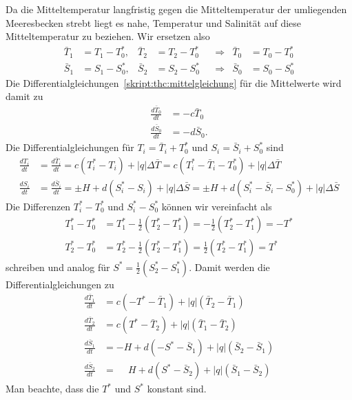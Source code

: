 Da die Mitteltemperatur langfristig gegen die Mitteltemperatur der
umliegenden Meeresbecken strebt liegt es nahe, Temperatur und
Salinität auf diese Mitteltemperatur zu beziehen.
Wir ersetzen also
\begin{equation}
\begin{aligned}
\bar T_1&=T_1-T_0^*,
&
\bar T_2&=T_2-T_0^*
&&\Rightarrow&
\bar T_0&=T_0-T_0^*
\\
\bar S_1&=S_1-S_0^*,
&
\bar S_2&=S_2-S_0^*
&&\Rightarrow&
\bar S_0&=S_0-S_0^*
\end{aligned}
\end{equation}
Die Differentialgleichungen~\eqref{skript:thc:mittelgleichung}
für die Mittelwerte wird damit zu
\begin{align*}
\frac{d\bar T_0}{dt} &= -c \bar T_0\\
\frac{d\bar S_0}{dt} &= -d \bar S_0.
\end{align*}
Die Differentialgleichungen für
$T_i=\bar T_i + T_0^*$
und
$S_i=\bar S_i + S_0^*$
sind
\begin{align*}
\frac{dT_i}{dt}
&=
\frac{d\bar T_i}{dt}
=
c(T_i^*-T_i)
+ |q|\Delta \bar T
=
c(T_i^*- \bar T_i - T_0^*)
+ |q|\Delta \bar T
\\
\frac{dS_i}{dt}
&=
\frac{d\bar S_i}{dt}
=
\pm H
+
d(S_i^*-S_i)
+ |q|\Delta \bar S
=
\pm H
+
d(S_i^*- \bar S_i - S_0^*)
+ |q|\Delta \bar S
\end{align*}
Die Differenzen $T_i^*-T_0^*$ und $S_i^*-S_0^*$ können wir vereinfacht
als
\begin{align*}
T_1^*-T_0^* 
&=
T_1^* - \frac12(T_2^*-T_1^*)
=
-\frac12(T_2^*-T_1^*)
=
-T^*
\\
T_2^*-T_0^*
&=
T_2^*-\frac12(T_2^*-T_1^*)
=
\frac12(T_2^*-T_1^*)
=
T^*
\end{align*}
schreiben und analog für $S^*=\frac12(S_2^*-S_1^*)$.
Damit werden die Differentialgleichungen zu
\begin{equation}
\begin{aligned}
\frac{d\bar T_1}{dt}
&=
c(-T^*-\bar T_1) + |q| (\bar T_2-\bar T_1)
\\
\frac{d\bar T_2}{dt}
&=
c(T^*-\bar T_2) + |q| (\bar T_1-\bar T_2)
\\
\frac{d\bar S_1}{dt}
&=
-H
+
d(-S^*-\bar S_1) + |q|(\bar S_2 - \bar S_1)
\\
\frac{d\bar S_2}{dt}
&=
\phantom{-}H
+
d(S^*-\bar S_2) + |q|(\bar S_1 - \bar S_2)
\end{aligned}
\label{skript:thc:anomaliegleichungen}
\end{equation}
Man beachte, dass die $T^*$ und $S^*$ konstant sind.


